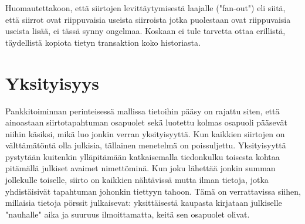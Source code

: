 \documentclass{article}
\begin{document}
Huomautettakoon, että siirtojen levittäytymisestä laajalle ("fan-out") eli siitä, että siirrot ovat riippuvaisia useista siirroista jotka puolestaan ovat riippuvaisia useista lisää, ei tässä synny ongelmaa. Koskaan ei tule tarvetta ottaa erillistä, täydellistä kopiota tietyn transaktion koko historiasta.

\section{Yksityisyys}

Pankkitoiminnan perinteisessä mallissa tietoihin pääsy on rajattu siten, että ainoastaan siirtotapahtuman osapuolet sekä luotettu kolmas osapuoli pääsevät niihin käsiksi, mikä luo jonkin verran yksityisyyttä. Kun kaikkien siirtojen on välttämätöntä olla julkisia, tällainen menetelmä on poissuljettu. Yksityisyyttä pystytään kuitenkin ylläpitämään katkaisemalla tiedonkulku toisesta kohtaa pitämällä julkiset avaimet nimettöminä. Kun joku lähettää jonkin summan jollekulle toiselle, siirto on kaikkien nähtävissä mutta ilman tietoja, jotka yhdistäisivät tapahtuman johonkin tiettyyn tahoon. Tämä on verrattavissa siihen, millaisia tietoja pörssit julkaisevat: yksittäisestä kaupasta kirjataan julkiselle "nauhalle" aika ja suuruus ilmoittamatta, keitä sen osapuolet olivat.
\end{document}
